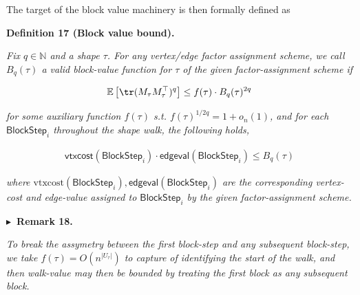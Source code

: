 The target of the block value machinery is then formally defined as\par





\par\medskip\noindent\textbf{
\textbf{Definition 17}\textbf{ }(Block value bound)\textbf{.}
}\par



\emph{Fix $q\in\mathbb{N}$ and a shape $\tau$. For any vertex/edge factor assignment scheme, we call $B_{q}(\tau)$ a valid block-value function for $\tau$ of the given factor-assignment scheme if}\par


\[\begin{gathered}
\mathbb{E}\left[\tr(M_{\tau}M_{\tau}^{\top})^{q}\right]\leq f(\tau)\cdot B_{q}(\tau)^{2q}
\end{gathered}\]


\emph{for some auxiliary function $f(\tau)$ s.t. $f(\tau)^{1/2q}=1+o_{n}(1)$,
and for each $\mathsf{BlockStep}_{i}$ throughout the shape walk, the following holds,}\par


\[\begin{gathered}
\mathsf{vtxcost}(\mathsf{BlockStep}_{i})\cdot\mathsf{edgeval}(\mathsf{BlockStep}_{i})\leq B_{q}(\tau)
\end{gathered}\]


\emph{where $\text{vtxcost}(\mathsf{BlockStep}_{i}),\mathsf{edgeval}(\mathsf{BlockStep}_{i})$ are the corresponding vertex-cost and edge-value assigned to $\mathsf{BlockStep}_{i}$ by the given factor-assignment scheme.}\par







\par\medskip\noindent\textbf{
$\blacktriangleright$ Remark 18.
}\par



\emph{To break the assymetry between the first block-step and any subsequent block-step, we take $f(\tau)=O(n^{|U_{\tau}|})$ to capture of identifying the start of the walk, and then walk-value may then be bounded by treating the first block as any subsequent block.}\par



